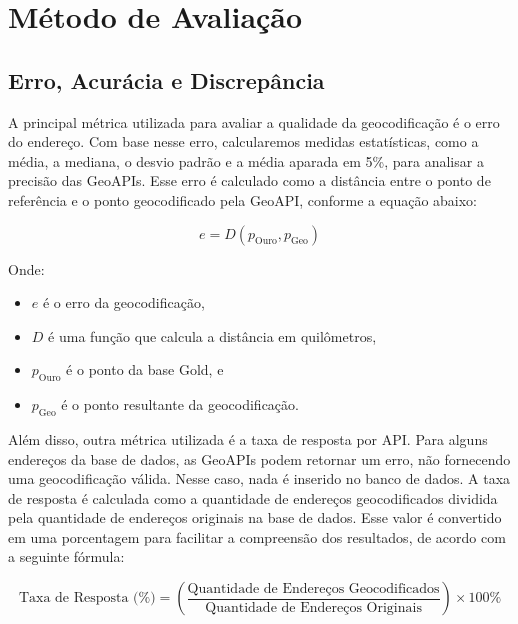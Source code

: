 \section{Método de Avaliação}

\subsection{Erro, Acurácia e Discrepância}

A principal métrica utilizada para avaliar a qualidade da geocodificação é o erro do endereço. Com base nesse erro, calcularemos medidas estatísticas, como a média, a mediana, o desvio padrão e a média aparada em 5\%, para analisar a precisão das GeoAPIs. Esse erro é calculado como a distância entre o ponto de referência e o ponto geocodificado pela GeoAPI, conforme a equação abaixo:

\begin{equation}
e = D(p_{\text{Ouro}}, p_{\text{Geo}})
\end{equation}

Onde:
\begin{itemize}
\item $e$ é o erro da geocodificação,
\item $D$ é uma função que calcula a distância em quilômetros,
\item $p_{\text{Ouro}}$ é o ponto da base Gold, e
\item $p_{\text{Geo}}$ é o ponto resultante da geocodificação.
\end{itemize}

Além disso, outra métrica utilizada é a taxa de resposta por API. Para alguns endereços da base de dados, as GeoAPIs podem retornar um erro, não fornecendo uma geocodificação válida. Nesse caso, nada é inserido no banco de dados. A taxa de resposta é calculada como a quantidade de endereços geocodificados dividida pela quantidade de endereços originais na base de dados. Esse valor é convertido em uma porcentagem para facilitar a compreensão dos resultados, de acordo com a seguinte fórmula:

\begin{equation}
\text{Taxa de Resposta (\%)} = \left(\frac{\text{Quantidade de Endereços Geocodificados}}{\text{Quantidade de Endereços Originais}}\right) \times 100\%
\end{equation}
